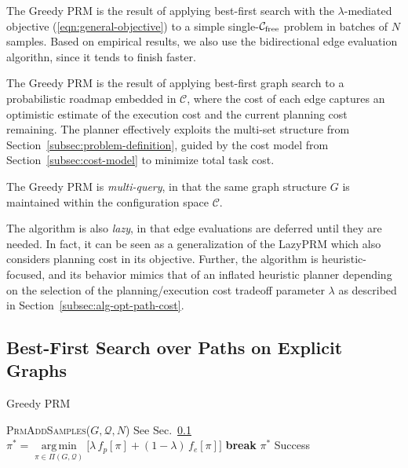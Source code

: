 \documentclass{report}
\DeclareMathOperator*{\argmin}{arg\,min}
\begin{document}
The Greedy PRM is the result of applying
best-first search with the $\lambda$-mediated objective
(\ref{eqn:general-objective})
to a simple single-$\mathcal{C}_{\mbox{\scriptsize free}}$ problem
in batches of $N$ samples.
Based on empirical results, we also use the bidirectional edge evaluation
algorithn,
since it tends to finish faster.

The Greedy PRM is the result of applying
best-first graph search to
a probabilistic roadmap \cite{kavrakietal1996prm}
embedded in $\mathcal{C}$,
where the cost of each edge captures an optimistic estimate of
the execution cost and the current planning cost remaining.
The planner effectively exploits the multi-set structure
from Section~\ref{subsec:problem-definition},
guided by the cost model from Section~\ref{subsec:cost-model}
to minimize total task cost.

The Greedy PRM is \emph{multi-query},
in that the same graph
structure $G$ is maintained within the configuration space
$\mathcal{C}$.

The algorithm is also \emph{lazy},
in that edge evaluations are deferred until they are needed.
In fact, it can be seen as a generalization of the
LazyPRM \cite{bohlin2000lazyprm}
which also considers planning cost in its objective.
Further,
the algorithm is heuristic-focused,
and its behavior mimics that of an inflated heuristic planner
depending on the selection of the planning/execution cost
tradeoff parameter $\lambda$
as described in Section~\ref{subsec:alg-opt-path-cost}.

\subsection{Best-First Search over Paths on Explicit Graphs}
\label{subsec:alg-greedy-prm}

\begin{algorithm}
\caption{Greedy PRM}
\label{alg:greedy-prm}
\begin{algorithmic}[1]
\Loop
   \State \textsc{PrmAddSamples}($G, \mathcal{Q}, N$)
      \Comment See Sec.~\ref{subsec:alg-greedy-prm}
   \Loop
         \label{line:best-first-start}
      \State $\pi^* = \argmin\limits_{\pi \in \Pi(G,\mathcal{Q})}
         \big[ \lambda \, f_p[\pi] + (1 - \lambda) \, f_e[\pi] \big]$
         \label{line:e8-select-optimistic-path}
        \State \textbf{break}
      \EndIf
         \State \Return $\pi^*$
            \Comment Success
      \EndIf
   \EndLoop
      \label{line:best-first-end}
\EndLoop
\EndProcedure
\end{algorithmic}
\end{algorithm}
\end{document}
